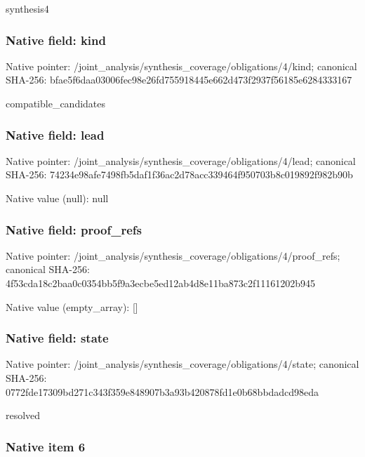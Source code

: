 \documentclass[10pt,a4paper]{article}
\begin{document}
synthesis4


\subsubsection{Native field: kind}


Native pointer: /joint\_analysis/synthesi\allowbreak{}s\_coverage/obligations/4\allowbreak{}/kind; canonical SHA-256: bfae5f6daa03006fec98e26f\allowbreak{}d755918445e662d473f2937f\allowbreak{}56185e6284333167


compatible\_candidates


\subsubsection{Native field: lead}


Native pointer: /joint\_analysis/synthesi\allowbreak{}s\_coverage/obligations/4\allowbreak{}/lead; canonical SHA-256: 74234e98afe7498fb5daf1f3\allowbreak{}6ac2d78acc339464f950703b\allowbreak{}8c019892f982b90b



Native value (null): null



\subsubsection{Native field: proof\_refs}


Native pointer: /joint\_analysis/synthesi\allowbreak{}s\_coverage/obligations/4\allowbreak{}/proof\_refs; canonical SHA-256: 4f53cda18c2baa0c0354bb5f\allowbreak{}9a3ecbe5ed12ab4d8e11ba87\allowbreak{}3c2f11161202b945



Native value (empty\_array): []



\subsubsection{Native field: state}


Native pointer: /joint\_analysis/synthesi\allowbreak{}s\_coverage/obligations/4\allowbreak{}/state; canonical SHA-256: 0772fde17309bd271c343f35\allowbreak{}9e848907b3a93b420878fd1e\allowbreak{}0b68bbdadcd98eda


resolved


\subsubsection{Native item 6}
\end{document}
